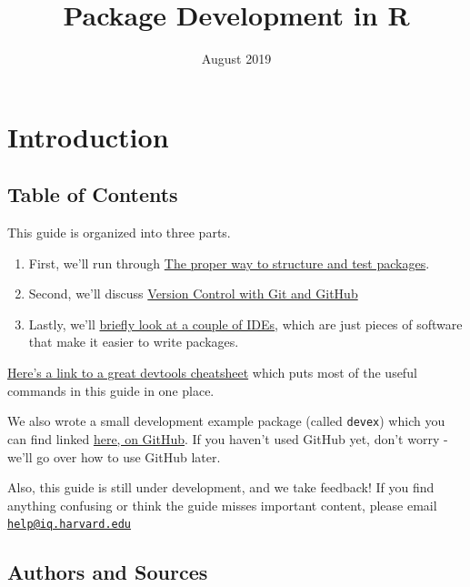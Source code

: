 \documentclass[]{book}
\title{Package Development in R}
\author{}
\date{August 2019}
\providecommand{\tightlist}{%
  \setlength{\itemsep}{0pt}\setlength{\parskip}{0pt}}
\begin{document}
\maketitle

{
\setcounter{tocdepth}{1}
\tableofcontents
}
\chapter*{Introduction}\label{introduction}

\section*{Table of Contents}\label{table-of-contents}

This guide is organized into three parts.

\begin{enumerate}
\def\labelenumi{\arabic{enumi}.}
\tightlist
\item
  First, we'll run through \href{./package-development.html}{The proper
  way to structure and test packages}.
\item
  Second, we'll discuss \href{./version-control.html}{Version Control
  with Git and GitHub}
\item
  Lastly, we'll
  \href{./integrated-development-environments.html}{briefly look at a
  couple of IDEs}, which are just pieces of software that make it easier
  to write packages.
\end{enumerate}

\href{https://www.rstudio.com/wp-content/uploads/2015/03/devtools-cheatsheet.pdf}{Here's
a link to a great devtools cheatsheet} which puts most of the useful
commands in this guide in one place.

We also wrote a small development example package (called
\texttt{devex}) which you can find linked
\href{https://github.com/IQSS/dss-rbuild/tree/master/devex}{here, on
GitHub}. If you haven't used GitHub yet, don't worry - we'll go over how
to use GitHub later.

Also, this guide is still under development, and we take feedback! If
you find anything confusing or think the guide misses important content,
please email
\href{mailto:help@iq.harvard.edu}{\nolinkurl{help@iq.harvard.edu}}

\section*{Authors and Sources}\label{authors-and-sources}
\end{document}
